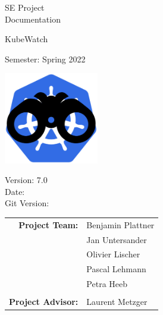 \begin{titlepage}

    \begin{center}


        \vspace{1 cm}

        {\Large SE Project \\ Documentation} \\

        \vspace{0.5cm}

        {\Huge KubeWatch}

        \vspace{0.5cm}

        Semester: Spring 2022

        \vspace{0.5 cm}

        \includegraphics[height=4cm]{resources/KubeWatchLogo.png}

        \vspace{0.5 cm}

        Version: 7.0 \\
        Date: \DTMnow \\
        Git Version: \gitDescription
        \vspace{1 cm}

        \begin{tabular}{rl}
            \textbf{Project Team:}    & Benjamin Plattner \\
                                      & Jan Untersander \\
                                      & Olivier Lischer \\
                                      & Pascal Lehmann \\
                                      & Petra Heeb \\
                                      &                    \\
            \textbf{Project Advisor:} & Laurent Metzger
        \end{tabular}


\end{center}
\end{titlepage}
